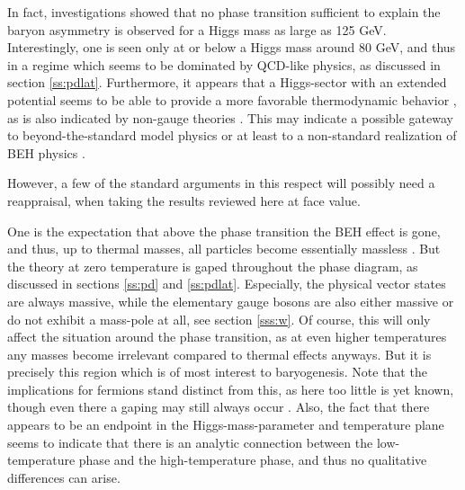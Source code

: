 \documentclass[final,12pt]{article}
\newcommand*{\1}{1\!\!\!\bot}
\begin{document}
In fact, investigations \cite{Kajantie:1996mn,Csikor:1998ge} showed that no phase transition sufficient to explain the baryon asymmetry is observed for a Higgs mass as large as 125 GeV. Interestingly, one is seen only at or below a Higgs mass around 80 GeV, and thus in a regime which seems to be dominated by QCD-like physics, as discussed in section \ref{ss:pdlat}. Furthermore, it appears that a Higgs-sector with an extended potential seems to be able to provide a more favorable thermodynamic behavior \cite{Grojean:2004xa,Reichert:2017puo}, as is also indicated by non-gauge theories \cite{Chu:2017vmc,Hegde:2013mks,Akerlund:2015fya}. This may indicate a possible gateway to beyond-the-standard model physics or at least to a non-standard realization of BEH physics \cite{Reichert:2017puo}.

However, a few of the standard arguments in this respect will possibly need a reappraisal, when taking the results reviewed here at face value.

One is the expectation that above the phase transition the BEH effect is gone, and thus, up to thermal masses, all particles become essentially massless \cite{Kapusta:2006pm}. But the theory at zero temperature is gaped throughout the phase diagram, as discussed in sections \ref{ss:pd} and \ref{ss:pdlat}. Especially, the physical vector states are always massive, while the elementary gauge bosons are also either massive or do not exhibit a mass-pole at all, see section \ref{sss:w}. Of course, this will only affect the situation around the phase transition, as at even higher temperatures any masses become irrelevant compared to thermal effects anyways. But it is precisely this region which is of most interest to baryogenesis. Note that the implications for fermions stand distinct from this, as here too little is yet known, though even there a gaping may still always occur \cite{Iida:2007qp}. Also, the fact that there appears to be an endpoint in the Higgs-mass-parameter and temperature plane \cite{Kapusta:2006pm,Kajantie:1996mn,Csikor:1998ge} seems to indicate that there is an analytic connection between the low-temperature phase and the high-temperature phase, and thus no qualitative differences can arise.
\end{document}
